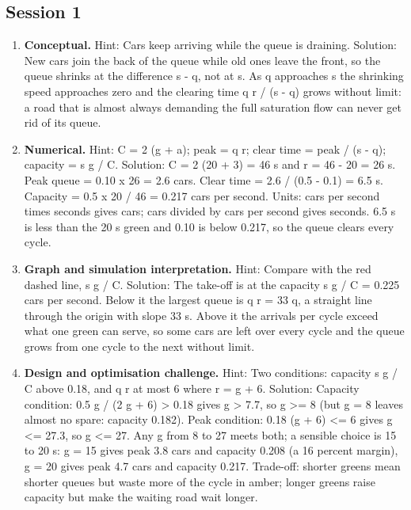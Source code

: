 \documentclass[11pt,a4paper]{article}
\begin{document}
\subsection*{Session 1}
\begin{enumerate}[nosep]
\item \textbf{Conceptual.} Hint: Cars keep arriving while the queue is draining. Solution: New cars join the back of the queue while old ones leave the front, so the queue shrinks at the difference s - q, not at s. As q approaches s the shrinking speed approaches zero and the clearing time q r / (s - q) grows without limit: a road that is almost always demanding the full saturation flow can never get rid of its queue.
\item \textbf{Numerical.} Hint: C = 2 (g + a); peak = q r; clear time = peak / (s - q); capacity = s g / C. Solution: C = 2 (20 + 3) = 46 s and r = 46 - 20 = 26 s. Peak queue = 0.10 x 26 = 2.6 cars. Clear time = 2.6 / (0.5 - 0.1) = 6.5 s. Capacity = 0.5 x 20 / 46 = 0.217 cars per second. Units: cars per second times seconds gives cars; cars divided by cars per second gives seconds. 6.5 s is less than the 20 s green and 0.10 is below 0.217, so the queue clears every cycle.
\item \textbf{Graph and simulation interpretation.} Hint: Compare with the red dashed line, s g / C. Solution: The take-off is at the capacity s g / C = 0.225 cars per second. Below it the largest queue is q r = 33 q, a straight line through the origin with slope 33 s. Above it the arrivals per cycle exceed what one green can serve, so some cars are left over every cycle and the queue grows from one cycle to the next without limit.
\item \textbf{Design and optimisation challenge.} Hint: Two conditions: capacity s g / C above 0.18, and q r at most 6 where r = g + 6. Solution: Capacity condition: 0.5 g / (2 g + 6) \textgreater{} 0.18 gives g \textgreater{} 7.7, so g \textgreater{}= 8 (but g = 8 leaves almost no spare: capacity 0.182). Peak condition: 0.18 (g + 6) \textless{}= 6 gives g \textless{}= 27.3, so g \textless{}= 27. Any g from 8 to 27 meets both; a sensible choice is 15 to 20 s: g = 15 gives peak 3.8 cars and capacity 0.208 (a 16 percent margin), g = 20 gives peak 4.7 cars and capacity 0.217. Trade-off: shorter greens mean shorter queues but waste more of the cycle in amber; longer greens raise capacity but make the waiting road wait longer.
\end{enumerate}
\end{document}
